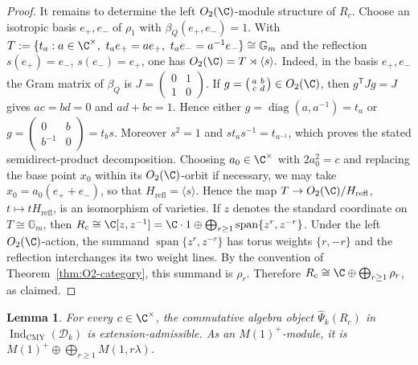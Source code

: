 \documentclass[12pt,leqno]{amsart}
\numberwithin{equation}{section} \newtheorem{thm}{Theorem}[section] \newtheorem{lem}[thm]{Lemma} \newtheorem{ex}[thm]{Example} \newtheorem{prop}[thm]{Proposition} \newtheorem{cor}[thm]{Corollary} \newtheorem{defi}[thm]{Definition} \newtheorem{rmk}[thm]{Remark} \newtheorem{notation}[thm]{Notation}
\newcommand{\Dk}{\mathcal D_k}
\newcommand{\IndCMY}{\operatorname{Ind}_{\mathrm{CMY}}}
\newcommand{\Otwo}{O_2(\C)}
\begin{document}
\begin{proof}
It remains to determine the left $\Otwo$-module structure of $R_c$. Choose an isotropic basis $e_+,e_-$ of $\rho_1$ with \(\beta_Q(e_+,e_-)=1\). With \(T:=\{t_a:a\in\C^\times,\ t_a e_+=ae_+,\ t_a e_-=a^{-1}e_-\} \cong\mathbb G_m\) and the reflection $s(e_+)=e_-$, $s(e_-)=e_+$, one has \(\Otwo=T\rtimes\langle s\rangle.\) Indeed, in the basis $e_+,e_-$ the Gram matrix of $\beta_Q$ is \(J=\left(\begin{smallmatrix}0&1\\1&0\end{smallmatrix}\right)\). If \(g=\left(\begin{smallmatrix}a&b\\c&d\end{smallmatrix}\right)\in\Otwo\), then $g^{\mathsf T}Jg=J$ gives \(ac=bd=0\) and \(ad+bc=1\). Hence either \(g=\operatorname{diag}(a,a^{-1})=t_a\) or \(g=\left(\begin{smallmatrix}0&b\\b^{-1}&0\end{smallmatrix}\right)=t_b s\). Moreover $s^2=1$ and $st_as^{-1}=t_{a^{-1}}$, which proves the stated semidirect-product decomposition. Choosing $a_0\in\C^\times$ with $2a_0^2=c$ and replacing the base point $x_0$ within its $\Otwo$-orbit if necessary, we may take \(x_0=a_0(e_++e_-)\), so that \(H_{\mathrm{refl}}=\langle s\rangle.\) Hence the map $T\to\Otwo/H_{\mathrm{refl}}$, $t\mapsto tH_{\mathrm{refl}}$, is an isomorphism of varieties. If $z$ denotes the standard coordinate on $T\cong\mathbb G_m$, then \(R_c\cong\C[z,z^{-1}] =\C\cdot1\oplus\bigoplus_{r\ge1}\operatorname{span}\{z^r,z^{-r}\}\). Under the left $\Otwo$-action, the summand $\operatorname{span}\{z^r,z^{-r}\}$ has torus weights $\{r,-r\}$ and the reflection interchanges its two weight lines. By the convention of Theorem~\ref{thm:O2-category}, this summand is $\rho_r$. Therefore \(R_c\cong\C\oplus\bigoplus_{r\ge1}\rho_r\), as claimed.
\end{proof}

\begin{lem}\label{lem:O2-admissible}
For every $c\in\C^\times$, the commutative algebra object $\widehat\Psi_k(R_c)$ in $\IndCMY(\Dk)$ is extension-admissible. As an $M(1)^+$-module, it is \(M(1)^+\oplus\bigoplus_{r\ge1}M(1,r\lambda)\).
\end{lem}
\end{document}
